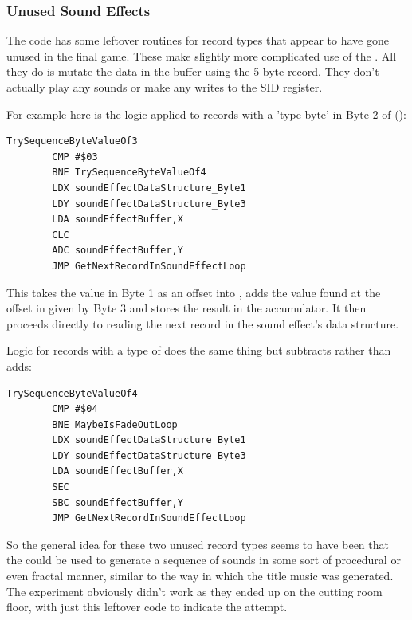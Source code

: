 \subsubsection{Unused Sound Effects}
The  code has some leftover routines for record types that appear to have gone unused in the final
game. These make slightly more complicated use of the . All they do is mutate the data in the buffer
using the 5-byte record. They don't actually play any sounds or make any writes to the SID register.

For example here is the logic applied to records with a 'type byte' in Byte 2 of ():

\begin{lstlisting}
TrySequenceByteValueOf3   
        CMP #$03
        BNE TrySequenceByteValueOf4
        LDX soundEffectDataStructure_Byte1
        LDY soundEffectDataStructure_Byte3
        LDA soundEffectBuffer,X
        CLC
        ADC soundEffectBuffer,Y
        JMP GetNextRecordInSoundEffectLoop
\end{lstlisting}

This takes the value in Byte 1 as an offset into , adds the value found at the offset in 
given by Byte 3 and stores the result in the  accumulator. It then proceeds directly to reading the next record in the sound
effect's data structure.

Logic for records with a type of  does the same thing but subtracts rather than adds:

\begin{lstlisting}
TrySequenceByteValueOf4   
        CMP #$04
        BNE MaybeIsFadeOutLoop
        LDX soundEffectDataStructure_Byte1
        LDY soundEffectDataStructure_Byte3
        LDA soundEffectBuffer,X
        SEC
        SBC soundEffectBuffer,Y
        JMP GetNextRecordInSoundEffectLoop
\end{lstlisting}

So the general idea for these two unused record types seems to have been that the  could be used to generate
a sequence of sounds in some sort of procedural or even fractal manner, similar to the way in which the title music was generated. The
experiment obviously didn't work as they ended up on the cutting room floor, with just this leftover code to indicate the attempt.


